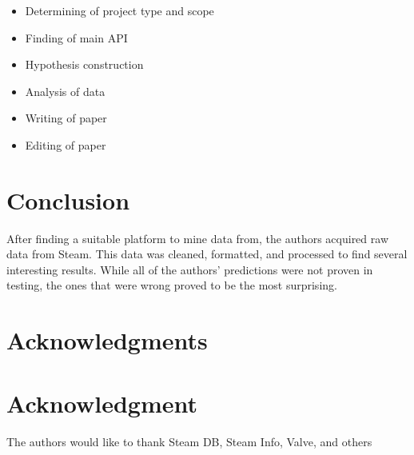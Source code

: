 \documentclass[10pt,journal,compsoc]{IEEEtran}
\begin{document}
\begin{itemize}
    \item Determining of project type and scope
    \item Finding of main API
    \item Hypothesis construction
    \item Analysis of data
    \item Writing of paper
    \item Editing of paper
\end{itemize}


\section{Conclusion}

After finding a suitable platform to mine data from, the authors acquired raw
data from Steam. This data was cleaned, formatted, and processed to find
several interesting results. While all of the authors' predictions were not
proven in testing, the ones that were wrong proved to be the most surprising.

\ifCLASSOPTIONcompsoc
  \section*{Acknowledgments}
\else
  \section*{Acknowledgment}
\fi


The authors would like to thank Steam DB, Steam Info, Valve, and others

\ifCLASSOPTIONcaptionsoff
  \newpage
\fi






\end{document}
